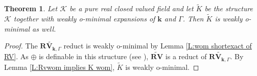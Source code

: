 \documentclass[11pt]{amsart}
\newtheorem{theorem}{Theorem}[section]
\newtheorem{claim}{Claim}[theorem]
\theoremstyle{definition}
\newcommand{\bk}{\textbf{k}}
\newcommand{\CK}{{\mathcal K}}
\newcommand{\0}{\emptyset}
\newenvironment{claimproof}[1][\proofname]
{%
	\proof[#1]%
	\renewcommand*\qedsymbol{$\square$ (claim)}%
}
{%
	\endproof%
}
\begin{document}
        




    \begin{theorem}\label{T:appendix theorem}
        Let $\CK$ be a pure real closed valued field and let $\widetilde{K}$ be  the structure $\CK$ together with weakly o-minimal expansions of $\bk$ and $\Gamma$. Then $\widetilde{K}$ is weakly o-minimal as well.
    \end{theorem}
    \begin{proof}
           The $\widetilde{\mathbf{RV}_{\bk,\Gamma}}$ reduct is weakly o-minimal by Lemma \ref{L:wom shortexact of RV}.  As $\oplus$ is definable in this structure (see  \cite[Section 3]{ChSi:inp}), $\widetilde{\mathbf{RV}}$ is a reduct of $\widetilde{\mathbf{RV}_{\bk,\Gamma}}$. By Lemma \ref{L:Rvwom implies K wom}, $\widetilde{K}$ is weakly o-minimal.
    \end{proof}
\end{document}

